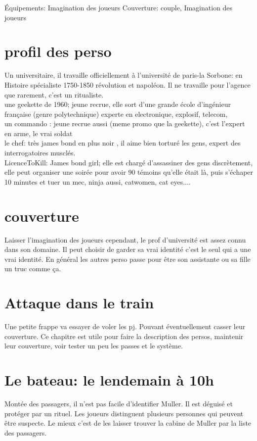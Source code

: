 \documentclass[oneside,12pt]{book}
\begin{document}
\begin{flushleft}
Équipements: Imagination des joueurs
Couverture: couple, Imagination des joueurs
\section{profil des perso}
Un universitaire, il travaille officiellement à l'université de paris-la Sorbone: en Histoire spécialiste 1750-1850 révolution et napoléon. Il ne travaille pour l'agence que rarement, c'est un ritualiste. \\
une geekette de 1960; jeune recrue, elle sort d'une grande école d'ingénieur française (genre polytechnique) experte en electronique, explosif, telecom, \\
un commando : jeune recrue aussi (meme promo que la geekette), c'est l'expert en arme, le vrai soldat \\
le chef: très james bond en plus noir , il aime bien torturé les gens, expert des interrogatoires musclés.\\
LicenceToKill: James bond girl; elle est chargé d'assassiner des gens discrètement, elle peut organiser une soirée pour avoir 90 témoins qu'elle était là, puis s'échaper 10 minutes et tuer un mec, ninja aussi, catwomen, cat eyes....\\



\section{couverture}
Laisser l'imagination des joueurs cependant, le prof d'université est assez connu dans son domaine. Il peut choisir de garder sa vrai identité c'est le seul qui a une vrai identité. En général les autres perso passe pour être son assistante ou sa fille un truc comme ça.

\section{Attaque dans le train}
Une petite frappe va essayer de voler les pj. Pouvant éventuellement casser leur couverture. Ce chapitre est utile pour faire la description des persos, maintenir leur couverture, voir tester un peu les passes et le système.

\section{Le bateau: le lendemain à  10h}
Montée des passagers, il n'est pas facile d'identifier Muller. Il est déguisé et protéger par un rituel. 
Les joueurs distinguent plusieurs personnes qui peuvent être suspecte. Le mieux c'est de les laisser trouver la cabine de Muller par la liste des passagers.


\end{flushleft}
\end{document}
